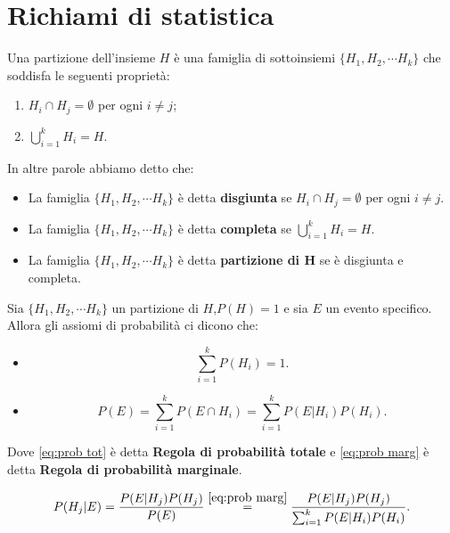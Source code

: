 \documentclass[../main.tex]{subfiles}
\begin{document}
\section{Richiami di statistica}
\begin{definition}
    Una partizione dell'insieme $H$ è una famiglia di sottoinsiemi $\{ H_{1},H_{2},\cdots H_{k}\}$ che soddisfa le seguenti proprietà:
    \begin{enumerate}
        \item $H_{i}\cap H_{j}=\emptyset$ per ogni $i\neq j$;
        \item $\bigcup_{i=1}^{k}H_{i}=H$.
    \end{enumerate}
\end{definition}
In altre parole abbiamo detto che:
\begin{itemize}
    \item La famiglia $\{ H_{1},H_{2},\cdots H_{k}\}$ è detta \textbf{disgiunta} se $H_{i}\cap H_{j}=\emptyset$ per ogni $i\neq j$.
    \item La famiglia $\{ H_{1},H_{2},\cdots H_{k}\}$ è detta \textbf{completa} se $\bigcup_{i=1}^{k}H_{i}=H$.
    \item La famiglia $\{ H_{1},H_{2},\cdots H_{k}\}$ è detta \textbf{partizione di H} se è disgiunta e completa. 
\end{itemize}
Sia $\{ H_{1},H_{2},\cdots H_{k}\}$ un partizione di $H$,$P(H)=1$ e sia $E$ un evento specifico. Allora gli assiomi di probabilità ci dicono che:
\begin{itemize}
    \item \begin{equation}\label{eq:prob tot}
        \sum_{i=1}^{k}P(H_{i})=1.
    \end{equation}
    \item \begin{equation}\label{eq:prob marg}
        P(E)=\sum_{i=1}^{k}P(E\cap H_{i})=\sum_{i=1}^{k}P(E|H_{i})P(H_{i}).
    \end{equation}
\end{itemize}
Dove \ref{eq:prob tot} è detta \textbf{Regola di probabilità totale} e \ref{eq:prob marg} è detta \textbf{Regola di probabilità marginale}.
\begin{definition}
\begin{equation}
    P(H_{j}|E)=\frac{P(E|H_{j})P(H_{j})}{P(E)}\stackrel{\ref{eq:prob marg}}{=}\frac{P(E|H_{j})P(H_{j})}{\sum_{i=1}^{k}P(E|H_{i})P(H_{i})}.
\end{equation}
\end{definition}
\end{document}
